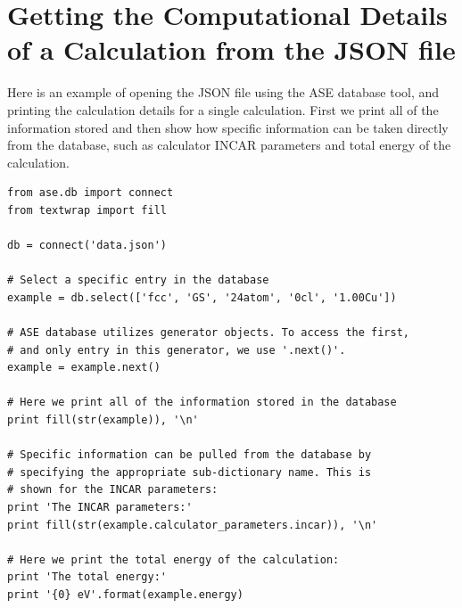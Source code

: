 \documentclass[number, sort&compress, review, 12pt]{elsarticle}
\begin{document}
\section{Getting the Computational Details of a Calculation from the JSON file}
\label{sec-3}
Here is an example of opening the JSON file using the ASE database tool, and printing the calculation details for a single calculation. First we print all of the information stored and then show how specific information can be taken directly from the database, such as calculator INCAR parameters and total energy of the calculation.

\begin{verbatim}
from ase.db import connect
from textwrap import fill

db = connect('data.json')

# Select a specific entry in the database
example = db.select(['fcc', 'GS', '24atom', '0cl', '1.00Cu'])

# ASE database utilizes generator objects. To access the first,
# and only entry in this generator, we use '.next()'.
example = example.next()

# Here we print all of the information stored in the database
print fill(str(example)), '\n'

# Specific information can be pulled from the database by
# specifying the appropriate sub-dictionary name. This is
# shown for the INCAR parameters:
print 'The INCAR parameters:'
print fill(str(example.calculator_parameters.incar)), '\n'

# Here we print the total energy of the calculation:
print 'The total energy:'
print '{0} eV'.format(example.energy)
\end{verbatim}
\end{document}
